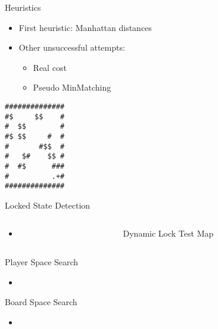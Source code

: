 \documentclass{beamer}
\begin{document}
\begin{frame}{Heuristics}
  \begin{itemize}
    \item First heuristic: Manhattan distances
    \item Other unsuccessful attempts:
    \begin{itemize}
      \item Real cost
      \item Pseudo MinMatching
    \end{itemize}
  \end{itemize}
\end{frame}

\begin{lrbox}{\maplocked}
  \begin{minipage}{.25\textwidth}
\centering
\begin{BVerbatim}
##############
#$     $$    #
#  $$        #
#$ $$     #  #
#       #$$  #
#   $#    $$ #
#  #$      ###
#          .+#
##############
\end{BVerbatim}
  \end{minipage}
\end{lrbox}%

\begin{frame}{Locked State Detection}
  \begin{columns}
    \begin{column}{.5\textwidth}
      \begin{itemize}
        \item
      \end{itemize}
    \end{column}
    \begin{column}{.5\textwidth}
      \begin{block}{Dynamic Lock Test Map}
        \centering
        \usebox{\maplocked}
      \end{block}
    \end{column}
  \end{columns}

\end{frame}

\begin{frame}{Player Space Search}
  \begin{itemize}
  \item
  \end{itemize}
\end{frame}

\begin{frame}{Board Space Search}
  \begin{itemize}
  \item
  \end{itemize}
\end{frame}
\end{document}
